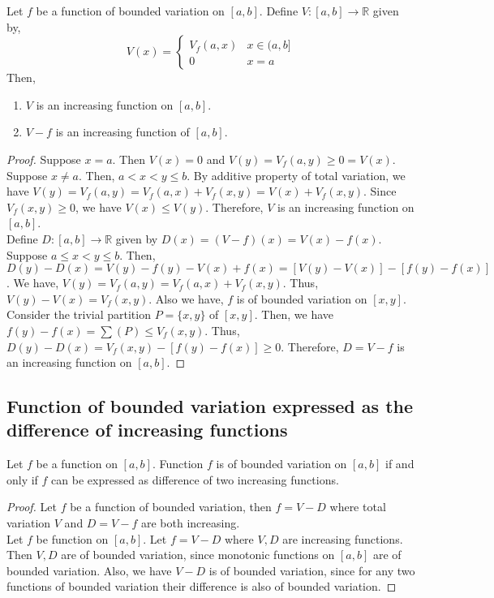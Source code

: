 \begin{theorem}
	Let $f$ be a function of bounded variation on $[a,b]$.
	Define $V : [a,b] \to \mathbb{R}$ given by,
	\[ V(x) = \begin{cases} V_f(a,x) & x \in (a,b] \\ 0 & x = a \end{cases} \]
	Then,
	\begin{enumerate}
		\item $V$ is an increasing function on $[a,b]$.
		\item $V-f$ is an increasing function of $[a,b]$.
	\end{enumerate}
\end{theorem}
\begin{proof}
	Suppose $x = a$.
	Then $V(x) = 0$ and $V(y) = V_f(a,y) \ge 0 = V(x)$.\\
	Suppose $x \ne a$.
	Then, $a < x < y \le b$.
	By additive property of total variation, we have $V(y) = V_f(a,y) = V_f(a,x)+V_f(x,y) = V(x) + V_f(x,y)$.
	Since $V_f(x,y) \ge 0$, we have $V(x) \le V(y)$.
	Therefore, $V$ is an increasing function on $[a,b]$.\\

	Define $D : [a,b] \to \mathbb{R}$ given by $D(x)  = (V-f)(x) = V(x) - f(x)$.
	Suppose $a \le x < y \le b$.
	Then, $D(y)-D(x) = V(y)-f(y)-V(x)+f(x) = [V(y)-V(x)] - [f(y)-f(x)]$.
	We have, $V(y) = V_f(a,y) = V_f(a,x)+V_f(x,y)$.
	Thus, $V(y)-V(x) = V_f(x,y)$.
	Also we have, $f$ is of bounded variation on $[x,y]$.
	Consider the trivial partition $P = \{ x,y\}$ of $[x,y]$.
	Then, we have $f(y) - f(x) = \sum (P) \le V_f(x,y)$.
	Thus, $D(y)-D(x) = V_f(x,y) - [f(y)-f(x)] \ge 0$.
	Therefore, $D = V-f$ is an increasing function on $[a,b]$.
\end{proof}

\subsection{Function of bounded variation expressed as the difference of increasing functions}
\begin{theorem}
	Let $f$ be a function on $[a,b]$.
	Function $f$ is of bounded variation on $[a,b]$ if and only if $f$ can be expressed as difference of two increasing functions.
\end{theorem}
\begin{proof}
	Let $f$ be a function of bounded variation, then $f = V-D$ where total variation $V$ and $D = V-f$ are both increasing.\\

	Let $f$ be function on $[a,b]$.
	Let $f = V-D$ where $V,D$ are increasing functions. 
	Then $V,D$ are of bounded variation, since monotonic functions on $[a,b]$ are of bounded variation.
	Also, we have $V-D$ is of bounded variation, since for any two functions of bounded variation their difference is also of bounded variation.
\end{proof}

